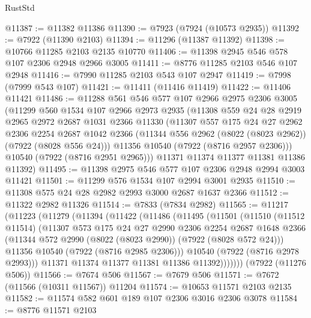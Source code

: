 \begin{lexlean}{RustStd}
\begin{coremodule}
@11387 := @11382 @11386
@11390 := @7923 (@7924 (@10573 @2935))
@11392 := @7922 (@11390 @2103)
@11394 := @11296 (@11387 @11392)
@11398 := @10766 @11285 @2103 @2135 @10770
@11406 := @11398 @2945 @546 @578 @107 @2306 @2948 @2966 @3005
@11411 := @8776 @11285 @2103 @546 @107 @2948
@11416 := @7990 @11285 @2103 @543 @107 @2947
@11419 := @7998 (@7999 @543 @107)
@11421 := @11411 (@11416 @11419)
@11422 := @11406 @11421
@11486 := @11288
    @561
    @546
    @577
    @107
    @2966
    @2975
    @2306
    @3005
    (@11299
      @560
      @1534
      @107
      @2966
      @2973
      @2935
      (@11308
        @559
        @24
        @28
        @2919
        @2965
        @2972
        @2687
        @1031
        @2366
        @11330
        (@11307
          @557
          @175
          @24
          @27
          @2962
          @2306
          @2254
          @2687
          @1042
          @2366
          (@11344 @556 @2962 (@8022 (@8023 @2962)) (@7922 (@8028 @556 @24)))
          @11356
          @10540
          (@7922 (@8716 @2957 @2306)))
        @10540
        (@7922 (@8716 @2951 @2965)))
      @11371
      @11374
      @11377
      @11381
      @11386
      @11392)
@11495 := @11398 @2975 @546 @577 @107 @2306 @2948 @2994 @3003 @11421
@11501 := @11299 @576 @1534 @107 @2994 @3001 @2935
@11510 := @11308 @575 @24 @28 @2982 @2993 @3000 @2687 @1637 @2366
@11512 := @11322 @2982 @11326
@11514 := @7833 (@7834 @2982)
@11565 := @11217
    (@11223
      (@11279
        (@11394
          (@11422
            (@11486
              (@11495
                (@11501
                  (@11510
                    (@11512 @11514)
                    (@11307
                      @573
                      @175
                      @24
                      @27
                      @2990
                      @2306
                      @2254
                      @2687
                      @1648
                      @2366
                      (@11344 @572 @2990 (@8022 (@8023 @2990)) (@7922 (@8028 @572 @24)))
                      @11356
                      @10540
                      (@7922 (@8716 @2985 @2306)))
                    @10540
                    (@7922 (@8716 @2978 @2993)))
                  @11371
                  @11374
                  @11377
                  @11381
                  @11386
                  @11392)))))))
    (@7922 (@11276 @506))
@11566 := @7674 @506
@11567 := @7679 @506
@11571 := @7672 (@11566 (@10311 @11567)) @11204
@11574 := @10653 @11571 @2103 @2135
@11582 := @11574 @582 @601 @189 @107 @2306 @3016 @2306 @3078
@11584 := @8776 @11571 @2103

\end{coremodule}
\end{lexlean}
